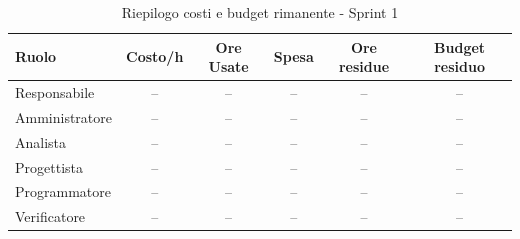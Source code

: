 \documentclass[a4paper,12pt]{article}
\begin{document}
\begin{table}[H]
\centering
\caption{Riepilogo costi e budget rimanente - Sprint 1}
\label{tab:risorse-rimanenti}
\vspace{2mm}
\begin{tabular}{lccccc}
\toprule
\textbf{Ruolo} & \textbf{Costo/h} & \textbf{Ore Usate} & \textbf{Spesa} & \textbf{Ore residue} & \textbf{Budget residuo}\\
\midrule
Responsabile & -- & -- & -- & -- & -- \\
Amministratore & -- & -- & -- & -- & -- \\
Analista & -- & -- & -- & -- & -- \\
Progettista & -- & -- & -- & -- & -- \\
Programmatore & -- & -- & -- & -- & -- \\
Verificatore & -- & -- & -- & -- & -- \\
\bottomrule
\end{tabular}
\end{table}
\end{document}
